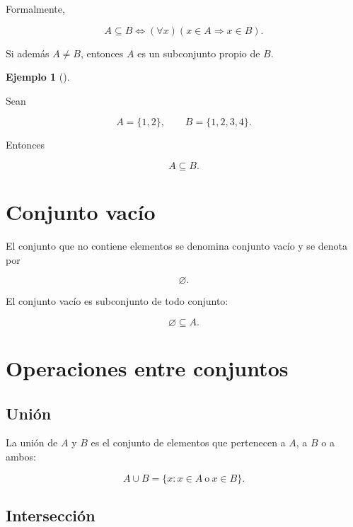 \documentclass[
  spanish,
  10.5pt,
  letterpaper,
  DIV=11,
  numbers=noendperiod,
  oneside,
  open=any]{scrreprt}
\theoremstyle{definition}
\theoremstyle{definition}
\newtheorem{example}{Ejemplo}[chapter]
\theoremstyle{plain}
\theoremstyle{remark}
\begin{document}
Formalmente,

\[
A\subseteq B
\iff
(\forall x)(x\in A\Rightarrow x\in B).
\]

Si además \(A\neq B\), entonces \(A\) es un subconjunto propio de \(B\).

\begin{example}[]\protect\hypertarget{exm-subconjunto}{}\label{exm-subconjunto}

Sean

\[
A=\{1,2\},
\qquad
B=\{1,2,3,4\}.
\]

Entonces

\[
A\subseteq B.
\]

\end{example}

\section*{Conjunto vacío}\label{conjunto-vacuxedo}


El conjunto que no contiene elementos se denomina conjunto vacío y se
denota por

\[
\varnothing.
\]

El conjunto vacío es subconjunto de todo conjunto:

\[
\varnothing\subseteq A.
\]

\section*{Operaciones entre
conjuntos}\label{operaciones-entre-conjuntos}


\subsection*{Unión}\label{uniuxf3n}

La unión de \(A\) y \(B\) es el conjunto de elementos que pertenecen a
\(A\), a \(B\) o a ambos:

\[
A\cup B
=
\{x:x\in A\ \text{o}\ x\in B\}.
\]

\subsection*{Intersección}\label{intersecciuxf3n}
\end{document}
